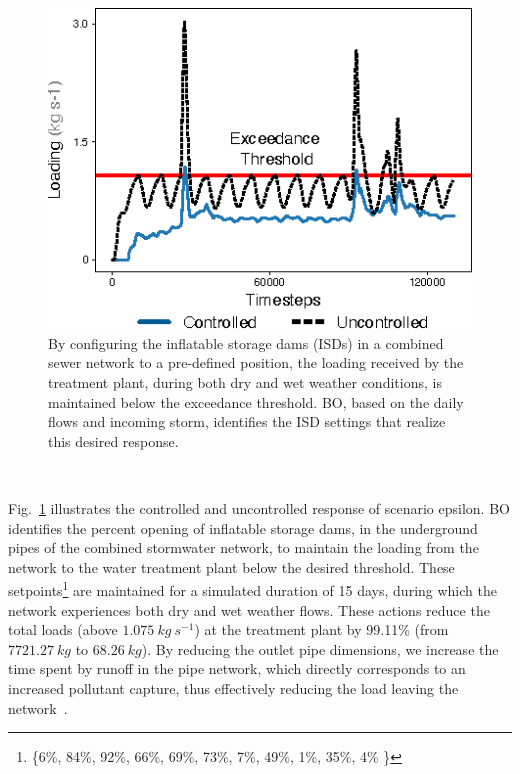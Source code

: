 \begin{figure}[ht]
	\includegraphics[width=\textwidth]{gfx/Chapter-4/generalizability_epsilon.eps}
	\caption{By configuring the inflatable storage dams (ISDs) in a combined sewer network to a pre-defined position, the loading received by the treatment plant, during both dry and wet weather conditions, is maintained below the exceedance threshold. 
	BO, based on the daily flows and incoming storm, identifies the ISD settings that realize this desired response.}\label{fig:epsilon}
\end{figure}

\

Fig.~\ref{fig:epsilon} illustrates the controlled and uncontrolled response of scenario epsilon.
BO identifies the percent opening of inflatable storage dams, in the underground pipes of the combined stormwater network, to maintain the loading from the network to the water treatment plant below the desired threshold.
These setpoints\footnote{\{6\%, 84\%, 92\%, 66\%, 69\%, 73\%, 7\%, 49\%, 1\%, 35\%, 4\% \}} are maintained for a simulated duration of 15 days, during which the network experiences both dry and wet weather flows.
These actions reduce the total loads (above $1.075\ kg\ s^{-1}$) at the treatment plant by 99.11\% (from $7721.27\ kg$ to $68.26\ kg$).
By reducing the outlet pipe dimensions, we increase the time spent by runoff in the pipe network, which directly corresponds to an increased pollutant capture, thus effectively reducing the load leaving the network~\cite{Troutman_2020}.





